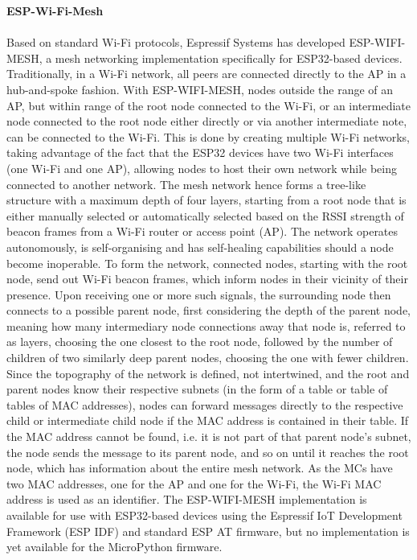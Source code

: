\textbf{ESP-Wi-Fi-Mesh}\\\\
Based on standard Wi-Fi protocols, Espressif Systems has developed ESP-WIFI-MESH, a mesh networking implementation specifically for ESP32-based devices. Traditionally, in a Wi-Fi network, all peers are connected directly to the AP in a hub-and-spoke fashion. With ESP-WIFI-MESH, nodes outside the range of an AP, but within range of the root node connected to the Wi-Fi, or an intermediate node connected to the root node either directly or via another intermediate note, can be connected to the Wi-Fi. This is done by creating multiple Wi-Fi networks, taking advantage of the fact that the ESP32 devices have two Wi-Fi interfaces (one Wi-Fi and one AP), allowing nodes to host their own network while being connected to another network. The mesh network hence forms a tree-like structure with a maximum depth of four layers, starting from a root node that is either manually selected or automatically selected based on the RSSI strength of beacon frames from a Wi-Fi router or access point (AP). The network operates autonomously, is self-organising and has self-healing capabilities should a node become inoperable. To form the network, connected nodes, starting with the root node, send out Wi-Fi beacon frames, which inform nodes in their vicinity of their presence. Upon receiving one or more such signals, the surrounding node then connects to a possible parent node, first considering the depth of the parent node, meaning how many intermediary node connections away that node is, referred to as layers, choosing the one closest to the root node, followed by the number of children of two similarly deep parent nodes, choosing the one with fewer children. Since the topography of the network is defined, not intertwined, and the root and parent nodes know their respective subnets (in the form of a table or table of tables of MAC addresses), nodes can forward messages directly to the respective child or intermediate child node if the MAC address is contained in their table. If the MAC address cannot be found, i.e. it is not part of that parent node's subnet, the node sends the message to its parent node, and so on until it reaches the root node, which has information about the entire mesh network. As the MCs have two MAC addresses, one for the AP and one for the Wi-Fi, the Wi-Fi MAC address is used as an identifier.
The ESP-WIFI-MESH implementation is available for use with ESP32-based devices using the Espressif IoT Development Framework (ESP IDF) and standard ESP AT firmware, but no implementation is yet available for the MicroPython firmware. \citep{espressif_systems_esp-wifi-mesh_nodate} \\

